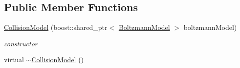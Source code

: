 \subsection*{Public Member Functions}
\begin{DoxyCompactItemize}
\item 
\hyperlink{classnatrium_1_1CollisionModel_a5afab5d75747f5239172a6d8a89affbe}{Collision\-Model} (boost\-::shared\-\_\-ptr$<$ \hyperlink{classnatrium_1_1BoltzmannModel}{Boltzmann\-Model} $>$ boltzmann\-Model)
\begin{DoxyCompactList}\small\item\em constructor \end{DoxyCompactList}\item 
\hypertarget{classnatrium_1_1CollisionModel_a2b1fb83814227db3b99d4d68a6657d52}{virtual \hyperlink{classnatrium_1_1CollisionModel_a2b1fb83814227db3b99d4d68a6657d52}{$\sim$\-Collision\-Model} ()}\label{classnatrium_1_1CollisionModel_a2b1fb83814227db3b99d4d68a6657d52}


\end{DoxyCompactItemize}
